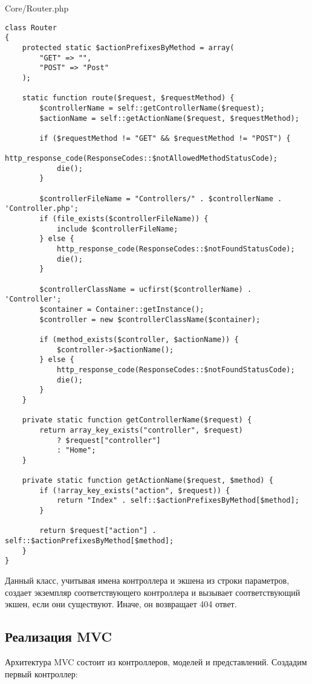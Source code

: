 \documentclass[a4paper,14pt]{extarticle}
\begin{document}
Core/Router.php
\begin{lstlisting}
class Router
{
    protected static $actionPrefixesByMethod = array(
        "GET" => "",
        "POST" => "Post"
    );

    static function route($request, $requestMethod) {
        $controllerName = self::getControllerName($request);
        $actionName = self::getActionName($request, $requestMethod);

        if ($requestMethod != "GET" && $requestMethod != "POST") {
            http_response_code(ResponseCodes::$notAllowedMethodStatusCode);
            die();
        }

        $controllerFileName = "Controllers/" . $controllerName . 'Controller.php';
        if (file_exists($controllerFileName)) {
            include $controllerFileName;
        } else {
            http_response_code(ResponseCodes::$notFoundStatusCode);
            die();
        }

        $controllerClassName = ucfirst($controllerName) . 'Controller';
        $container = Container::getInstance();
        $controller = new $controllerClassName($container);

        if (method_exists($controller, $actionName)) {
            $controller->$actionName();
        } else {
            http_response_code(ResponseCodes::$notFoundStatusCode);
            die();
        }
    }

    private static function getControllerName($request) {
        return array_key_exists("controller", $request)
            ? $request["controller"]
            : "Home";
    }

    private static function getActionName($request, $method) {
        if (!array_key_exists("action", $request)) {
            return "Index" . self::$actionPrefixesByMethod[$method];
        }

        return $request["action"] . self::$actionPrefixesByMethod[$method];
    }
}
\end{lstlisting}

Данный класс, учитывая имена контроллера и экшена из строки параметров,
создает экземпляр соответствующего контроллера и вызывает соответствующий экшен,
если они существуют. Иначе, он возвращает 404 ответ.

\subsection{Реализация MVC}
Архитектура MVC состоит из контроллеров, моделей и представлений. Создадим
первый контроллер:
\end{document}
